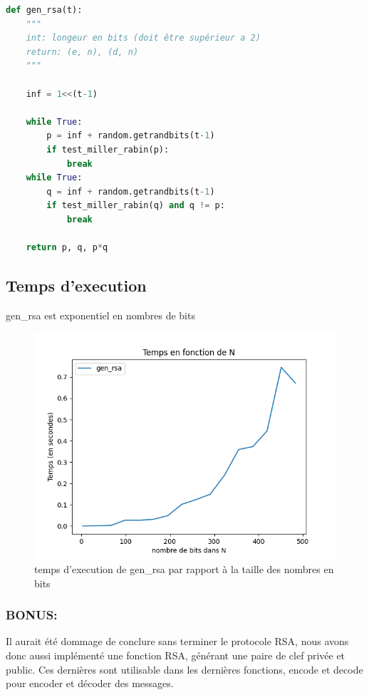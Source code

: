 \documentclass{article}
\begin{document}
\begin{lstlisting}[language=Python, caption=gen\_rsa]
def gen_rsa(t):
    """
    int: longeur en bits (doit être supérieur a 2)
    return: (e, n), (d, n)
    """

    inf = 1<<(t-1)

    while True:
        p = inf + random.getrandbits(t-1)
        if test_miller_rabin(p):
            break
    while True:
        q = inf + random.getrandbits(t-1)
        if test_miller_rabin(q) and q != p:
            break

    return p, q, p*q
\end{lstlisting}

\subsection{Temps d'execution}
gen\_rsa est exponentiel en nombres de bits
 \begin{figure}[H]
    \centering
     \includegraphics[scale=0.6]{Temps en fonction de N.png}
     \caption{\centering temps d'execution de gen\_rsa par rapport à la taille des nombres en bits}
 \end{figure}

\newpage
\subsubsection{BONUS:}


Il aurait été dommage de conclure sans terminer le protocole RSA, nous avons donc aussi implémenté une fonction RSA, générant une paire de clef privée et public.
Ces dernières sont utilisable dans les dernières fonctions, encode et decode pour encoder et décoder des messages.
\end{document}
